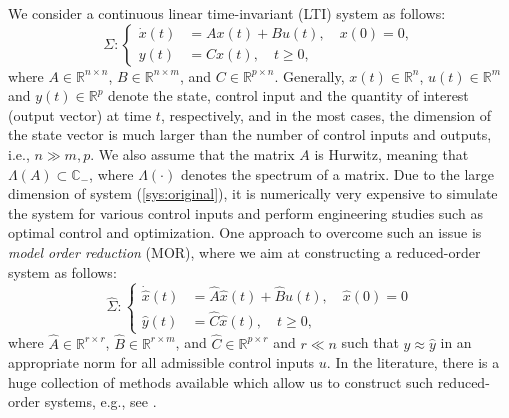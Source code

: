 \documentclass[a4paper,11pt, twoside]{article}
\def\R{\mathbb{R}}
\def\C{\mathbb{C}}
\begin{document}
We consider a continuous linear time-invariant (LTI) system as follows:
\begin{equation}\label{sys:original}
\Sigma:\left\{ \begin{aligned}
\dot x(t) &= Ax(t) +  Bu(t),\quad x(0) = 0,\\
y(t) &= Cx(t),\quad t\geq 0,
\end{aligned}\right.
\end{equation}
where $A \in \R^{n\times n}$, $B \in \R^{n\times m}$, and $C \in \R^{p\times n}$. Generally, $x(t) \in \R^n$, $u(t)\in \R^m$ and $y(t) \in \R^p$ 
denote the state, control input and the quantity of interest (output vector) at time $t$, respectively, and in the most cases, the dimension of the 
state vector is much larger than the number of control inputs and outputs, i.e., $n \gg m,p$. We also assume that the matrix $A$ is Hurwitz, meaning 
that $\Lambda(A) \subset \C_{-}$, where $\Lambda(\cdot)$ denotes the spectrum of a matrix.  Due to the large dimension of system 
(\ref{sys:original}), 
it is numerically very expensive to simulate the system for various control inputs and perform engineering studies such as optimal control and 
optimization. One approach to 
overcome such an issue is \emph{model order reduction} (MOR), where we aim at constructing a reduced-order system as follows:
\begin{equation}\label{sys:reduced}
\hat\Sigma:\left\{ \begin{aligned}
\dot {\hat x}(t) &= \hat A \hat x(t) +  \hat Bu(t), \quad \hat x(0) = 0\\
\hat y(t) &= \hat C\hat x(t),\quad t\geq 0,
\end{aligned}\right.
\end{equation}
where  $\hat A\in \R^{r\times r}$, $\hat B \in \R^{r\times m}$, and $\hat C \in \R^{p\times r}$ and $r \ll n$ such that $y \approx \hat y$ in an 
appropriate norm for all admissible control inputs $u$. In the literature, there is a huge collection of methods available which allow us to 
construct such reduced-order systems, e.g., see \cite{morAnt05,morBenMS05,morSchVR08}. 
\end{document}
